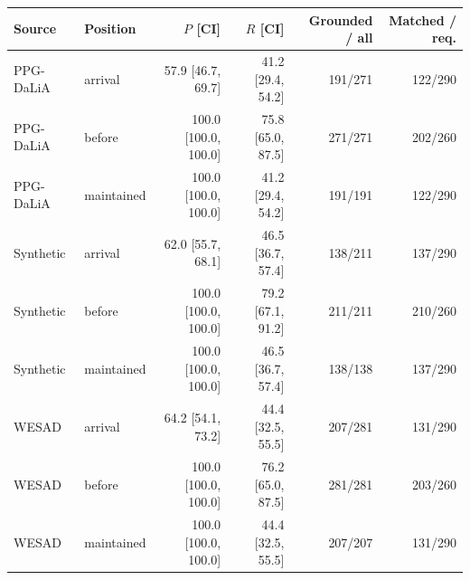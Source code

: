 \begin{tabular}{llrrrr}
\toprule
Source & Position & $P$ [CI] & $R$ [CI] & Grounded / all & Matched / req. \\
\midrule
PPG-DaLiA & arrival & 57.9 [46.7, 69.7] & 41.2 [29.4, 54.2] & 191/271 & 122/290 \\
PPG-DaLiA & before & 100.0 [100.0, 100.0] & 75.8 [65.0, 87.5] & 271/271 & 202/260 \\
PPG-DaLiA & maintained & 100.0 [100.0, 100.0] & 41.2 [29.4, 54.2] & 191/191 & 122/290 \\
Synthetic & arrival & 62.0 [55.7, 68.1] & 46.5 [36.7, 57.4] & 138/211 & 137/290 \\
Synthetic & before & 100.0 [100.0, 100.0] & 79.2 [67.1, 91.2] & 211/211 & 210/260 \\
Synthetic & maintained & 100.0 [100.0, 100.0] & 46.5 [36.7, 57.4] & 138/138 & 137/290 \\
WESAD & arrival & 64.2 [54.1, 73.2] & 44.4 [32.5, 55.5] & 207/281 & 131/290 \\
WESAD & before & 100.0 [100.0, 100.0] & 76.2 [65.0, 87.5] & 281/281 & 203/260 \\
WESAD & maintained & 100.0 [100.0, 100.0] & 44.4 [32.5, 55.5] & 207/207 & 131/290 \\
\bottomrule
\end{tabular}
